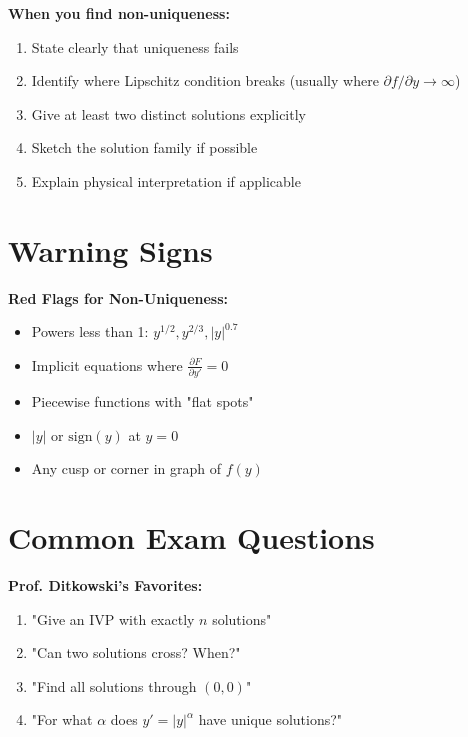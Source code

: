 \documentclass[12pt]{article}
\begin{document}
\begin{keypoint}
\textbf{When you find non-uniqueness:}
\begin{enumerate}
    \item State clearly that uniqueness fails
    \item Identify where Lipschitz condition breaks (usually where $\partial f/\partial y \to \infty$)
    \item Give at least two distinct solutions explicitly
    \item Sketch the solution family if possible
    \item Explain physical interpretation if applicable
\end{enumerate}
\end{keypoint}

\section{Warning Signs}

\begin{warning}
\textbf{Red Flags for Non-Uniqueness:}
\begin{itemize}
    \item Powers less than 1: $y^{1/2}, y^{2/3}, |y|^{0.7}$
    \item Implicit equations where $\frac{\partial F}{\partial y'} = 0$
    \item Piecewise functions with "flat spots"
    \item $|y|$ or $\text{sign}(y)$ at $y = 0$
    \item Any cusp or corner in graph of $f(y)$
\end{itemize}
\end{warning}

\section{Common Exam Questions}

\begin{mdframed}[backgroundcolor=blue!10]
\textbf{Prof. Ditkowski's Favorites:}
\begin{enumerate}
    \item "Give an IVP with exactly $n$ solutions"
    \item "Can two solutions cross? When?"
    \item "Find all solutions through $(0,0)$"
    \item "For what $\alpha$ does $y' = |y|^\alpha$ have unique solutions?"
\end{enumerate}
\end{mdframed}
\end{document}
